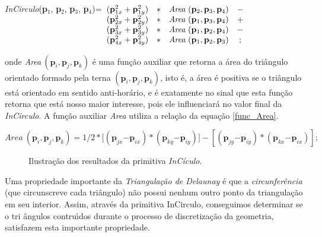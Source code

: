 \documentclass[12pt,a4paper]{book}
\begin{document}
\textit{InCirculo}(\textbf{p}$_{1}$, \textbf{p}$_{2}$, \textbf{p}$_{3}$, 
\textbf{p}$_{4}$)=$ 
\begin{array}[t]{cccc}
(\mathbf{p}_{1x}^{2}+\mathbf{p}_{1y}^{2}) & \ast & \textit{Area}%
\mathit{\ }(\mathbf{p}_{2},\mathbf{p}_{3},\mathbf{p}_{4}) & - \\ 
(\mathbf{p}_{2x}^{2}+\mathbf{p}_{2y}^{2}) & \ast & \textit{Area}%
\mathit{\ }(\mathbf{p}_{1},\mathbf{p}_{3},\mathbf{p}_{4}) & + \\ 
(\mathbf{p}_{3x}^{2}+\mathbf{p}_{3y}^{2}) & \ast & \textit{Area}%
\mathit{\ }(\mathbf{p}_{1},\mathbf{p}_{2},\mathbf{p}_{4}) & - \\ 
(\mathbf{p}_{4x}^{2}+\mathbf{p}_{4y}^{2}) & \ast & \textit{Area}%
\mathit{\ }(\mathbf{p}_{1},\mathbf{p}_{2},\mathbf{p}_{3}) & ;%
\end{array}
$

onde \textit{Area}$\mathit{\ }(\mathbf{p}_{i},\mathbf{p}_{j},\mathbf{p}_{k})$ 
\'{e} uma fun\c{c}\~{a}o auxiliar que retorna a \'{a}rea do tri\^{a}ngulo orientado formado pela terna $(\mathbf{p}_{i},\mathbf{p}_{j},\mathbf{p}_{k})$, isto \'{e}, a \'{a}rea \'{e} positiva se o tri\^{a}ngulo est\'{a} orientado em sentido anti-hor\'{a}rio, e \'{e} exatamente no sinal que esta fun\c{c}\~{a}o retorna  que est\'{a} nosso maior interesse, pois ele influenciar\'{a} no valor final da \textit{InCirculo}. A fun\c{c}\~{a}o auxiliar \textit{Area} utiliza a rela\c{c}\~{a}o da equa\c{c}\~{a}o \ref{func_Area}.

\begin{equation} \label{func_Area}
\mathit{Area\ }(\mathbf{p}_{i},\mathbf{p}_{j},\mathbf{p}_{k})=1/2\ast
\lbrack (\mathbf{p}_{jx}\mathbf{-\mathbf{p}}_{ix})\ast (\mathbf{p}_{ky}%
\mathbf{-\mathbf{p}}_{iy})]-[(\mathbf{p}_{jy}\mathbf{-\mathbf{p}}_{iy})\ast (%
\mathbf{p}_{kx}\mathbf{-\mathbf{p}}_{ix})];
\end{equation}


\begin{figure}[htbp]
  \begin{center}
    \leavevmode
    
    \caption{Ilustra\c{c}\~{a}o dos resultados da primitiva {\textit{InC\'{i}culo}}. }
    \label{fig2_chapter2}
  \end{center}
\end{figure}


Uma propriedade importante da \textit{Triangula\c{c}\~{a}o de Delaunay} \'{e}
que a \textit{circunfer\^{e}ncia } (que circunscreve cada tri\^{a}ngulo) n\~{a}o 
possui nenhum outro ponto da triangula\c{c}\~{a}o em seu interior.
Assim, atrav\'{e}s da primitiva InCirculo, conseguimos determinar se o tri%
\^{a}ngulos contru\'{\i}dos durante o processo de discretiza\c{c}\~{a}o da
geometria, satisfazem esta importante propriedade.
\end{document}
